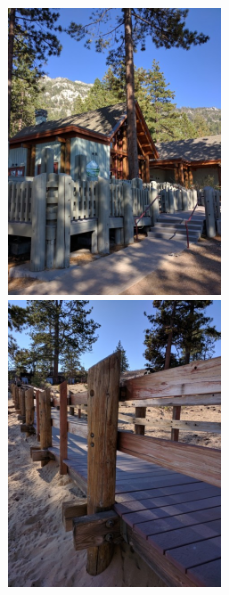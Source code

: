 \documentclass[10pt,twocolumn,letterpaper]{article}
\newcommand{\threewidth}{2.22in}
\begin{document}
\begin{figure}[!]
  \includegraphics[width=\threewidth]{figures/images/IMG_20160830_164615.jpg}
  \includegraphics[width=\threewidth]{figures/images/IMG_20160830_170629.jpg}

\end{figure}
\end{document}
